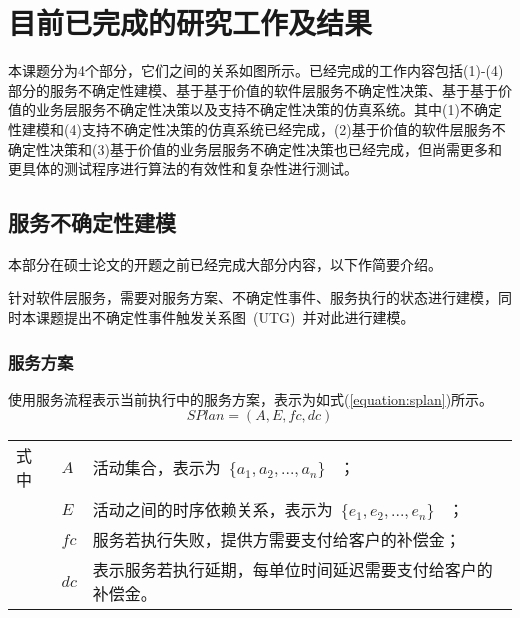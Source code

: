 

\section{目前已完成的研究工作及结果}

本课题分为4个部分，它们之间的关系如图所示。已经完成的工作内容包括(1)-(4)部分的服务不确定性建模、基于基于价值的软件层服务不确定性决策、基于基于价值的业务层服务不确定性决策以及支持不确定性决策的仿真系统。其中(1)不确定性建模和(4)支持不确定性决策的仿真系统已经完成，(2)基于价值的软件层服务不确定性决策和(3)基于价值的业务层服务不确定性决策也已经完成，但尚需更多和更具体的测试程序进行算法的有效性和复杂性进行测试。

\subsection{服务不确定性建模} \label{sec:model_section}

本部分在硕士论文的开题之前已经完成大部分内容，以下作简要介绍。

针对软件层服务，需要对服务方案、不确定性事件、服务执行的状态进行建模，同时本课题提出不确定性事件触发关系图~(UTG)~并对此进行建模。

\subsubsection{服务方案}

使用服务流程表示当前执行中的服务方案，表示为如式(\ref{equation:splan})所示。
\begin{equation}\label{equation:splan}
SPlan = \left( {A,E,fc,dc} \right)
\end{equation}
\begin{tabularx}{\textwidth}{@{}l@{\quad}l@{\pozhehao }X@{}}
    式中
    & ${A}$ & 活动集合，表示为~$\{{a_1}, {a_2},...,{a_n}\}$ ~； \\
    & ${E}$ & 活动之间的时序依赖关系，表示为~$\{{e_1}, {e_2},...,{e_n}\}$ ~；\\
    & ${fc}$ & 服务若执行失败，提供方需要支付给客户的补偿金；\\
    & ${dc}$ & 表示服务若执行延期，每单位时间延迟需要支付给客户的补偿金。
\end{tabularx}\vspace{\wordsep}

